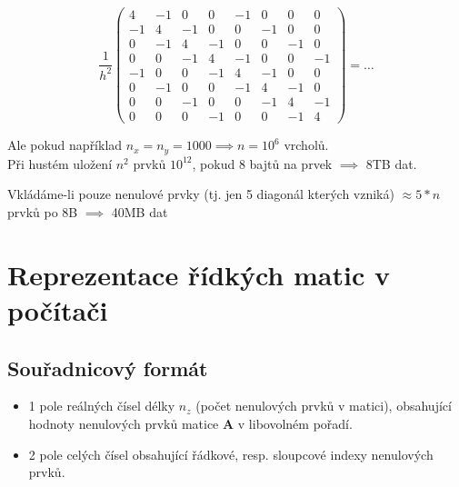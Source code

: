 \documentclass[../main.tex]{subfiles}
\begin{document}
\begin{example}
    \begin{equation*}
        \frac{1}{h^2} \begin{pmatrix}
            4 & -1 & 0 & 0 & -1 & 0 & 0 & 0 \\
            -1 & 4 & -1 & 0 & 0 & -1 & 0 & 0 \\
            0 & -1 & 4 & -1 & 0 & 0 & -1 & 0 \\
            0 & 0 & -1 & 4 & -1 & 0 & 0 & -1 \\
            -1 & 0 & 0 & -1 & 4 & -1 & 0 & 0 \\
            0 & -1 & 0 & 0 & -1 & 4 & -1 & 0 \\
            0 & 0 & -1 & 0 & 0 & -1 & 4 & -1 \\
            0 & 0 & 0 & -1 & 0 & 0 & -1 & 4 
            \end{pmatrix} = \dots
    \end{equation*}

    Ale pokud například $n_x = n_y = 1000 \implies n=10^6$ vrcholů.\\
    Při hustém uložení $n^2$ prvků $10^12$, pokud 8 bajtů na prvek $\implies$ 8TB dat.

    Vkládáme-li pouze nenulové prvky (tj. jen 5 diagonál kterých vzniká) $\approx 5*n$ prvků po 8B $\implies$ 40MB dat
\end{example}


\section{Reprezentace řídkých matic v počítači}
\subsection{Souřadnicový formát}
\begin{itemize}
    \item 1 pole reálných čísel délky $n_z$ (počet nenulových prvků v matici), 
    obsahující hodnoty nenulových prvků matice $\mathbf{A}$ v libovolném pořadí.
    \item 2 pole celých čísel obsahující řádkové, resp. sloupcové indexy nenulových prvků.
\end{itemize}
\end{document}
